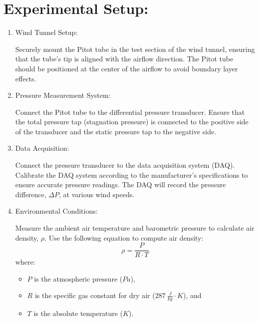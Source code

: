 \documentclass[12pt]{article}
\begin{document}
\section{Experimental Setup:}
\begin{enumerate}
\item Wind Tunnel Setup:

Securely mount the Pitot tube in the test section of the wind tunnel, ensuring that the tube’s tip is aligned with the airflow direction. 
The Pitot tube should be positioned at the center of the airflow to avoid boundary layer effects.

\item Pressure Measurement System:

Connect the Pitot tube to the differential pressure transducer. 
Ensure that the total pressure tap (stagnation pressure) is connected to the positive side of the transducer and the static pressure tap to the negative side.

\item Data Acquisition:

Connect the pressure transducer to the data acquisition system (DAQ). Calibrate the DAQ system according to the manufacturer’s specifications to ensure accurate pressure readings. The DAQ will record the pressure difference, $\Delta P$, at various wind speeds.

\item Environmental Conditions:

Measure the ambient air temperature and barometric pressure to calculate air density, $\rho$. Use the following equation to compute air density:
\begin{equation}
\rho=\frac{P}{R \cdot T}
\end{equation}
where:
\begin{itemize}
\item $P$ is the atmospheric pressure ($Pa$),
\item $R$ is the specific gas constant for dry air ($287~\frac{J}{kg} \cdot K$), and
\item $T$ is the absolute temperature ($K$).
\end{itemize}
\end{enumerate}
\clearpage
\end{document}
